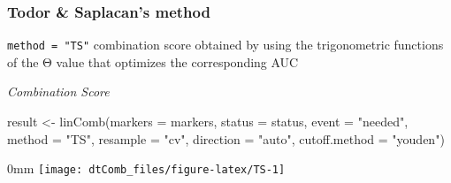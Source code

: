 \documentclass[]{article}
\newcommand{\hlstr}[1]{\textcolor[rgb]{0.251,0.627,0.251}{#1}}%
\newcommand{\hlstd}[1]{\textcolor[rgb]{0.251,0.251,0.251}{#1}}%
\newenvironment{Shaded}{\begin{myshaded}}{\end{myshaded}}
\newcommand{\StringTok}[1]{\hlstr{#1}}
\newcommand{\OtherTok}[1]{{#1}}
\newcommand{\FunctionTok}[1]{\hlstd{#1}}
\newcommand{\AttributeTok}[1]{{#1}}
\newcommand{\NormalTok}[1]{\hlstd{#1}}
\begin{document}
\hypertarget{todor-saplacans-method}{%
\subsubsection{Todor \& Saplacan's method}\label{todor-saplacans-method}}

\texttt{method = "TS"} combination score obtained by using the trigonometric functions of the Θ value that optimizes the corresponding AUC

\emph{Combination Score}

\begin{Shaded}
\begin{Highlighting}[]
\NormalTok{result }\OtherTok{\textless{}{-}} \FunctionTok{linComb}\NormalTok{(}\AttributeTok{markers =}\NormalTok{ markers, }
                  \AttributeTok{status =}\NormalTok{ status, }
                  \AttributeTok{event =} \StringTok{"needed"}\NormalTok{, }
                  \AttributeTok{method =} \StringTok{"TS"}\NormalTok{, }
                  \AttributeTok{resample =} \StringTok{"cv"}\NormalTok{, }
                  \AttributeTok{direction =} \StringTok{"auto"}\NormalTok{, }
                  \AttributeTok{cutoff.method =} \StringTok{"youden"}\NormalTok{)}
\end{Highlighting}
\end{Shaded}

\begin{adjustwidth}{\fltoffset}{0mm}
\texttt{[image: dtComb\_files/figure-latex/TS-1]} \end{adjustwidth}
\end{document}
